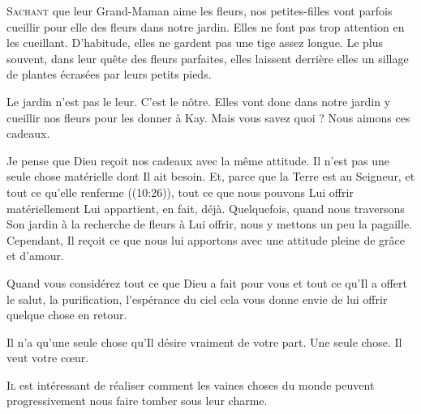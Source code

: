 \lettrine{S}{achant} que leur Grand-Maman aime les fleurs, nos petites-filles
 vont parfois cueillir pour elle des fleurs dans notre jardin.
 Elles ne font pas trop attention en les cueillant.
 D'habitude, elles ne gardent pas une tige assez longue.
 Le plus souvent, dans leur quête des fleurs parfaites, elles laissent derrière
 elles un sillage de plantes écrasées par leurs petits pieds.

Le jardin n'est pas le leur. C'est le nôtre. Elles vont donc dans notre jardin
 y cueillir nos fleurs pour les donner à Kay.
 Mais vous savez quoi ? Nous aimons ces cadeaux.

Je pense que Dieu reçoit nos cadeaux avec la même attitude.
 Il n'est pas une seule chose matérielle dont Il ait besoin.
 Et, parce que \og la Terre est au Seigneur, et tout ce qu'elle renferme \fg{}
 ((10:26)), tout ce que nous pouvons Lui offrir matériellement
 Lui appartient, en fait, déjà. Quelquefois, quand nous traversons Son jardin
 à la recherche de fleurs à Lui offrir, nous y mettons un peu la pagaille.
 Cependant, Il reçoit ce que nous lui apportons avec une attitude
 pleine de grâce et d'amour.

Quand vous considérez tout ce que Dieu a fait pour vous
 et tout ce qu'Il a offert \ocadr le salut, la purification,
 l'espérance du ciel \fcadr{} cela vous donne envie de lui offrir
 quelque chose en retour.


Il n'a qu'une seule chose qu'Il désire vraiment de votre part.
 Une seule chose. Il veut votre c\oe{}ur. 

\dvrule







\lettrine{I}{l} est intéressant de réaliser comment les vaines choses
 du monde peuvent progressivement nous faire tomber sous leur charme.


